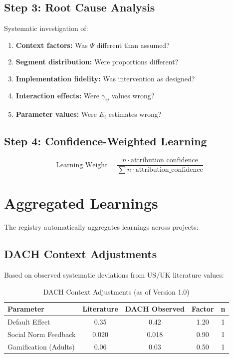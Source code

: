 \subsection{Step 3: Root Cause Analysis}

Systematic investigation of:
\begin{enumerate}
    \item \textbf{Context factors:} Was $\Psi$ different than assumed?
    \item \textbf{Segment distribution:} Were proportions different?
    \item \textbf{Implementation fidelity:} Was intervention as designed?
    \item \textbf{Interaction effects:} Were $\gamma_{ij}$ values wrong?
    \item \textbf{Parameter values:} Were $E_i$ estimates wrong?
\end{enumerate}

\subsection{Step 4: Confidence-Weighted Learning}

\begin{equation}
\text{Learning Weight} = \frac{n \cdot \text{attribution\_confidence}}{\sum n \cdot \text{attribution\_confidence}}
\end{equation}

\section{Aggregated Learnings}

The registry automatically aggregates learnings across projects:

\subsection{DACH Context Adjustments}

Based on observed systematic deviations from US/UK literature values:

\begin{table}[h]
\centering
\begin{tabular}{lcccc}
\toprule
\textbf{Parameter} & \textbf{Literature} & \textbf{DACH Observed} & \textbf{Factor} & \textbf{n} \\
\midrule
Default Effect & 0.35 & 0.42 & 1.20 & 1 \\
Social Norm Feedback & 0.020 & 0.018 & 0.90 & 1 \\
Gamification (Adults) & 0.06 & 0.03 & 0.50 & 1 \\
\bottomrule
\end{tabular}
\caption{DACH Context Adjustments (as of Version 1.0)}
\end{table}

